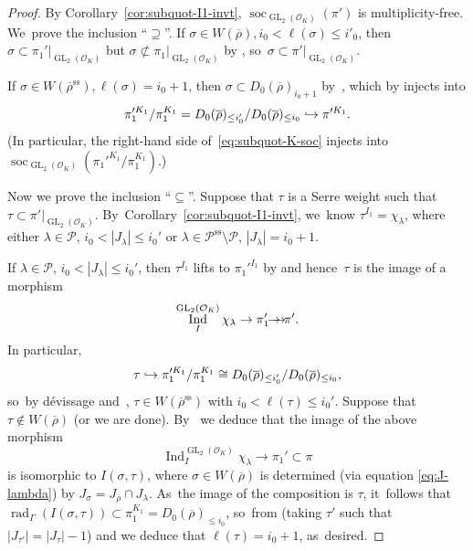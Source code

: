 \documentclass[JEP,XML,SOM,Unicode,NoFloatCountersInSection, NoEqCountersInSection,published]{cedram}
\newcommand\hto{\mathrel{\lhook\joinrel\to}}
\newcommand{\onto}{\mathchoice{\to\hspace*{-5mm}\to}{\mathrel{\hbox{$\to\hspace*{-2.85mm}\to$}}}{\to\hspace*{-3mm}\to}{\to\hspace*{-3mm}\to}}
\newcommand{\cO}{\mathcal{O}}
\renewcommand{\P}{\mathscr P}
\renewcommand{\ss}{\mathrm{ss}}
\newcommand{\brho}{\overline{\rho}}
\DeclareMathOperator{\GL}{GL}
\DeclareMathOperator{\Ind}{Ind}
\DeclareMathOperator{\rad}{rad}
\DeclareMathOperator{\soc}{soc}
\theoremstyle{plain}
\theoremstyle{definition}
\begin{document}
\begin{proof}
By Corollary~\ref{cor:subquot-I1-invt}, $\soc_{\GL_2(\cO_K)}(\pi')$ is multiplicity-free. We~prove the inclusion ``$\supseteq$''.
If $\sigma \in W(\brho), i_0 < \ell(\sigma) \le i'_0$, then $\sigma \subset \pi_1'|_{\GL_2(\cO_K)}$ but $\sigma \not\subset \pi_1|_{\GL_2(\cO_K)}$ by \cite[Cor.\,4.3.17]{BHHMS4}, so~$\sigma \subset \pi'|_{\GL_2(\cO_K)}$.

If $\sigma \in W(\brho^\ss), \ell(\sigma) = i_0+1$, then $\sigma \subset D_0(\brho)_{i_0+1}$ by~\cite[Eq.\,(66)]{BHHMS4}, which by \cite[Th.\,4.3.15]{BHHMS4} injects into
\begin{equation*}
\pi_1'^{K_1}/\pi_1^{K_1} = D_0(\brho)_{\le i_0'}/D_0(\brho)_{\le i_0} \hto \pi'^{K_1}.
\end{equation*}
(In particular, the right-hand side of~\eqref{eq:subquot-K-soc} injects into $\soc_{\GL_2(\cO_K)}(\pi_1'^{K_1}/\pi_1^{K_1})$.)

Now we prove the inclusion ``$\subseteq$''.
Suppose that $\tau$ is a Serre weight such that $\tau \subset \pi'|_{\GL_2(\cO_K)}$. By~Corollary~\ref{cor:subquot-I1-invt}, we~know $\tau^{I_1} = \chi_\lambda$, where either $\lambda \in \P$, $i_0 < |J_{\lambda}| \le i_0'$ or $\lambda\in \P^\ss\setminus \P$, $|J_{\lambda}| = i_0+1$.

If $\lambda \in \P$, $i_0 < |J_{\lambda}| \le i_0'$, then $\tau^{I_1}$ lifts to $\pi_1'^{I_1}$ by \cite[Cor.\,4.3.16]{BHHMS4} and hence~$\tau$ is the image of a morphism
\[
\Ind_I^{\GL_2(\cO_K)} \chi_\lambda \to \pi_1' \onto \pi'.
\]
In particular,
\[
\tau \hto \pi_1'^{K_1}/\pi_1^{K_1} \cong D_0(\brho)_{\le i'_0}/D_0(\brho)_{\le i_0},
\]
so~by dévissage and~\cite[Eq.\,(66)]{BHHMS4}, \hbox{$\tau \in W(\brho^\ss)$} with $i_0 < \ell(\tau) \le i_0'$.
Suppose that $\tau \notin W(\brho)$ (or we are done). By~\cite[Lem.\,4.1.1]{BHHMS4} we deduce that the image of the above morphism
\[
\Ind_I^{\GL_2(\cO_K)} \chi_\lambda \to \pi_1' \subset \pi
\]
is isomorphic to $I(\sigma,\tau)$, where $\sigma \in W(\brho)$ is determined (via equation \eqref{eq:J-lambda}) by $J_\sigma = J_{\brho} \cap J_\lambda$. As~the image of the composition is $\tau$, it~follows that $\rad_\Gamma(I(\sigma,\tau)) \subset \pi_1^{K_1} = D_0(\brho)_{\le i_0}$, so~from \cite[Lem.\,4.1.3]{BHHMS4} (taking $\tau'$ such that $|J_{\tau'}| = |J_\tau|-1$) and \cite[Eq.\,(66)]{BHHMS4} we deduce that $\ell(\tau) = i_0+1$, as~desired.


\end{proof}
\end{document}
